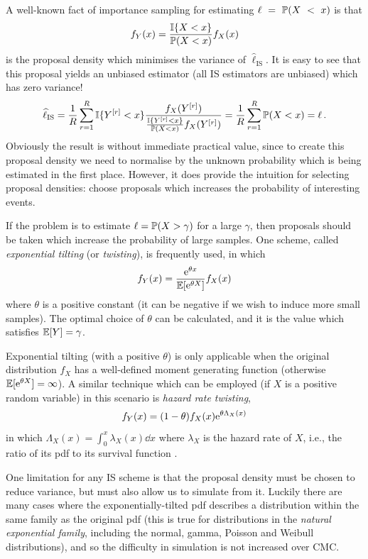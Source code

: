 A well-known fact of importance sampling for estimating $\ell~=~\operatorname{{\mathbb P}}(X~<~x)$ is that
\[ f_Y(x) = \frac{\mathbb{I}\{  X < x  \}}{\operatorname{{\mathbb P}}(X < x)} f_X(x) \]
is the proposal density which minimises the variance of $\hat{\ell}_{\mathrm{IS}}$. It is easy to see that this proposal yields an unbiased estimator (all IS estimators are unbiased) which has zero variance!
\[ \widehat{\ell}_{\mathrm{IS}} = \frac1R \sum_{r=1}^R \mathbb{I}\{  Y^{[r]} < x  \} \frac{f_X(Y^{[r]})}{ \frac{\mathbb{I}\{  Y^{[r]} < x  \}}{\operatorname{{\mathbb P}}(X<x)} f_X(Y^{[r]})} = \frac1R \sum_{r=1}^R \operatorname{{\mathbb P}}(X<x) = \ell \,. \]
Obviously the result is without immediate practical value, since to create this proposal density we need to normalise by the unknown probability which is being estimated in the first place. However, it does provide the intuition for selecting proposal densities: choose proposals which increases the probability of interesting events.

If the problem is to estimate $\ell = \operatorname{{\mathbb P}}(X > \gamma)$ for a large $\gamma$, then proposals should be taken which increase the probability of large samples. One scheme, called \emph{exponential tilting} (or \emph{twisting}), is frequently used, in which
\begin{equation} \label{def-exp-tilting}
f_Y(x) = \frac{\mathrm{e}^{\theta x}}{\operatorname{{\mathbb E}}[\mathrm{e}^{\theta X}]} f_X(x)
\end{equation}
where $\theta$ is a positive constant (it can be negative if we wish to induce more small samples). The optimal choice of $\theta$ can be calculated, and it is the value which satisfies $\operatorname{{\mathbb E}}[Y] = \gamma$.

Exponential tilting (with a positive $\theta$) is only applicable when the original distribution $f_X$ has a well-defined moment generating function (otherwise $\operatorname{{\mathbb E}}[\mathrm{e}^{\theta X}] = \infty$). A similar technique which can be employed (if $X$ is a positive random variable) in this scenario is \emph{hazard rate twisting},
\[ f_Y(x) = (1-\theta) f_X(x) \mathrm{e}^{\theta \Lambda_X(x)} \]
in which $\Lambda_X(x) = \int_0^x \lambda_X(x) \dd x$ where $\lambda_X$ is the hazard rate of $X$, i.e., the ratio of its pdf to its survival function \cite{juneja2002simulating}.

One limitation for any IS scheme is that the proposal density must be chosen to reduce variance, but must also allow us to simulate from it. Luckily there are many cases where the exponentially-tilted pdf describes a distribution within the same family as the original pdf (this is true for distributions in the \emph{natural exponential family}, including the normal, gamma, Poisson and Weibull distributions), and so the difficulty in simulation is not increased over CMC.

